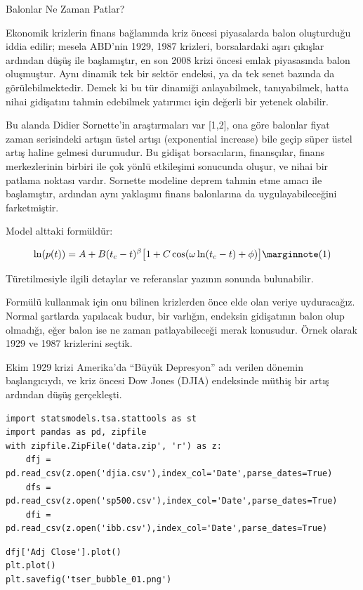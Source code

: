 \documentclass[12pt,fleqn]{article}\usepackage{../../common}
\begin{document}
Balonlar Ne Zaman Patlar?

Ekonomik krizlerin finans bağlamında kriz öncesi piyasalarda balon
oluşturduğu iddia edilir; mesela ABD'nin 1929, 1987 krizleri, borsalardaki
aşırı çıkışlar ardından düşüş ile başlamıştır, en son 2008 krizi öncesi
emlak piyasasında balon oluşmuştur. Aynı dinamik tek bir sektör endeksi, ya
da tek senet bazında da görülebilmektedir. Demek ki bu tür dinamiği
anlayabilmek, tanıyabilmek, hatta nihai gidişatını tahmin edebilmek
yatırımcı için değerli bir yetenek olabilir.

Bu alanda Didier Sornette'in araştırmaları var [1,2], ona göre balonlar
fiyat zaman serisindeki artışın üstel artışı (exponential increase) bile
geçip süper üstel artış haline gelmesi durumudur. Bu gidişat borsacıların,
finansçılar, finans merkezlerinin birbiri ile çok yönlü etkileşimi
sonucunda oluşur, ve nihai bir patlama noktası vardır. Sornette modeline
deprem tahmin etme amacı ile başlamıştır, ardından aynı yaklaşımı finans
balonlarına da uygulayabileceğini farketmiştir. 

Model alttaki formüldür:

$$ \ln(p(t)) = A + B(t_c - t)^\beta 
\big[ 1 + C \cos (\omega \ln(t_c-t) + \phi )  \big] 
\mlabel{1}
$$

Türetilmesiyle ilgili detaylar ve referanslar yazının sonunda bulunabilir.

Formülü kullanmak için onu bilinen krizlerden önce elde olan veriye
uyduracağız. Normal şartlarda yapılacak budur, bir varlığın, endeksin
gidişatının balon olup olmadığı, eğer balon ise ne zaman patlayabileceği
merak konusudur. Örnek olarak 1929 ve 1987 krizlerini seçtik. 

Ekim 1929 krizi Amerika'da ``Büyük Depresyon'' adı verilen dönemin
başlangıcıydı, ve kriz öncesi Dow Jones (DJIA) endeksinde müthiş bir artış
ardından düşüş gerçekleşti.

\begin{verbatim}
import statsmodels.tsa.stattools as st
import pandas as pd, zipfile
with zipfile.ZipFile('data.zip', 'r') as z:
    dfj =  pd.read_csv(z.open('djia.csv'),index_col='Date',parse_dates=True)
    dfs =  pd.read_csv(z.open('sp500.csv'),index_col='Date',parse_dates=True)
    dfi =  pd.read_csv(z.open('ibb.csv'),index_col='Date',parse_dates=True)
\end{verbatim}

\begin{verbatim}
dfj['Adj Close'].plot()
plt.plot()
plt.savefig('tser_bubble_01.png')
\end{verbatim}
\end{document}
